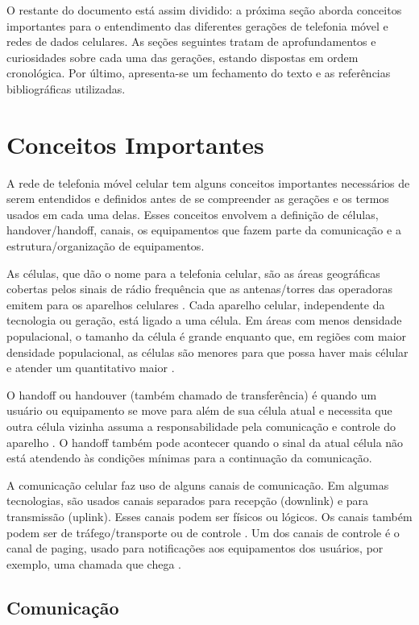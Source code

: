 \documentclass[11pt,oneside,a4paper]{abntex2}
\begin{document}
O restante do documento está assim dividido: a próxima seção aborda conceitos importantes para o entendimento das diferentes gerações de telefonia móvel e redes de dados celulares. As seções seguintes tratam de aprofundamentos e curiosidades sobre cada uma das gerações, estando dispostas em ordem cronológica. Por último, apresenta-se um fechamento do texto e as referências bibliográficas utilizadas.

\section*{Conceitos Importantes}
\label{conceitos}

A rede de telefonia móvel celular tem alguns conceitos importantes necessários de serem entendidos e definidos antes de se compreender as gerações e os termos usados em cada uma delas. Esses conceitos envolvem a definição de células, handover/handoff, canais, os equipamentos que fazem parte da comunicação e a estrutura/organização de equipamentos.

As células, que dão o nome para a telefonia celular, são as áreas geográficas cobertas pelos sinais de rádio frequência que as antenas/torres das operadoras emitem para os aparelhos celulares \cite{def-celula}. Cada aparelho celular, independente da tecnologia ou geração, está ligado a uma célula. Em áreas com menos densidade populacional, o tamanho da célula é grande enquanto que, em regiões com maior densidade populacional, as células são menores para que possa haver mais célular e atender um quantitativo maior \cite{livro-comer}.

O handoff ou handouver (também chamado de transferência) é quando um usuário ou equipamento se move para além de sua célula atual e necessita que outra célula vizinha assuma a responsabilidade pela comunicação e controle do aparelho \cite{def-handoff}. O handoff também pode acontecer quando o sinal da atual célula não está atendendo às condições mínimas para a continuação da comunicação.

A comunicação celular faz uso de alguns canais de comunicação. Em algumas tecnologias, são usados canais separados para recepção (downlink) e para transmissão (uplink). Esses canais podem ser físicos ou lógicos. Os canais também podem ser de tráfego/transporte ou de controle \cite{def-canal, tcc2}. Um dos canais de controle é o canal de paging, usado para notificações aos equipamentos dos usuários, por exemplo, uma chamada que chega \cite{def-paging}.

\subsection*{Comunicação}
\end{document}
